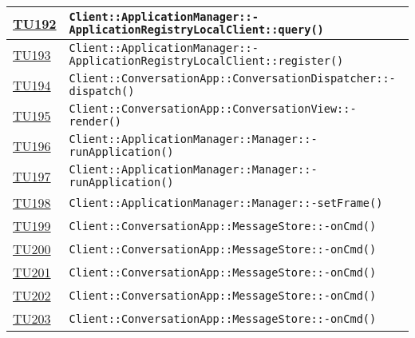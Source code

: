 \begin{longtable}{|>{\centering}m{1cm}|m{12cm}<{\centering}|}
\hyperlink{TU192}{TU192} & \texttt{Client::ApplicationManager::-\linebreak ApplicationRegistryLocalClient::query()}\\ \hline

\hyperlink{TU193}{TU193} & \texttt{Client::ApplicationManager::-\linebreak ApplicationRegistryLocalClient::register()}\\ \hline

\hyperlink{TU194}{TU194} & \texttt{Client::ConversationApp::ConversationDispatcher::-\linebreak dispatch()}\\ \hline

\hyperlink{TU195}{TU195} & \texttt{Client::ConversationApp::ConversationView::-\linebreak render()}\\ \hline

\hyperlink{TU196}{TU196} & \texttt{Client::ApplicationManager::Manager::-\linebreak runApplication()}\\ \hline

\hyperlink{TU197}{TU197} & \texttt{Client::ApplicationManager::Manager::-\linebreak runApplication()}\\ \hline

\hyperlink{TU198}{TU198} & \texttt{Client::ApplicationManager::Manager::-\linebreak setFrame()}\\ \hline

\hyperlink{TU199}{TU199} & \texttt{Client::ConversationApp::MessageStore::-\linebreak onCmd()}\\ \hline

\hyperlink{TU200}{TU200} & \texttt{Client::ConversationApp::MessageStore::-\linebreak onCmd()}\\ \hline

\hyperlink{TU201}{TU201} & \texttt{Client::ConversationApp::MessageStore::-\linebreak onCmd()}\\ \hline

\hyperlink{TU202}{TU202} & \texttt{Client::ConversationApp::MessageStore::-\linebreak onCmd()}\\ \hline

\hyperlink{TU203}{TU203} & \texttt{Client::ConversationApp::MessageStore::-\linebreak onCmd()}\\ \hline


\end{longtable}
